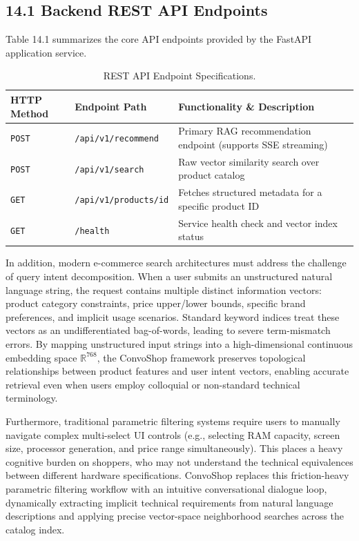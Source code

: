 \documentclass[12pt,a4paper]{article}
\begin{document}
\subsection*{14.1 Backend REST API Endpoints}
\label{sec:14.1}
Table 14.1 summarizes the core API endpoints provided by the FastAPI application service.

\begin{table}[h]
\centering
\caption{REST API Endpoint Specifications.}
\label{tab:14_1}
\begin{tabularx}{\textwidth}{@{} l l X @{}}
\toprule
\textbf{HTTP Method} & \textbf{Endpoint Path} & \textbf{Functionality \& Description} \\
\midrule
\texttt{POST} & \texttt{/api/v1/recommend} & Primary RAG recommendation endpoint (supports SSE streaming) \\
\texttt{POST} & \texttt{/api/v1/search} & Raw vector similarity search over product catalog \\
\texttt{GET} & \texttt{/api/v1/products/{id}} & Fetches structured metadata for a specific product ID \\
\texttt{GET} & \texttt{/health} & Service health check and vector index status \\
\bottomrule
\end{tabularx}
\end{table}



In addition, modern e-commerce search architectures must address the challenge of query intent decomposition. When a user submits an unstructured natural language string, the request contains multiple distinct information vectors: product category constraints, price upper/lower bounds, specific brand preferences, and implicit usage scenarios. Standard keyword indices treat these vectors as an undifferentiated bag-of-words, leading to severe term-mismatch errors. By mapping unstructured input strings into a high-dimensional continuous embedding space $\mathbb{R}^{768}$, the ConvoShop framework preserves topological relationships between product features and user intent vectors, enabling accurate retrieval even when users employ colloquial or non-standard technical terminology.

Furthermore, traditional parametric filtering systems require users to manually navigate complex multi-select UI controls (e.g., selecting RAM capacity, screen size, processor generation, and price range simultaneously). This places a heavy cognitive burden on shoppers, who may not understand the technical equivalences between different hardware specifications. ConvoShop replaces this friction-heavy parametric filtering workflow with an intuitive conversational dialogue loop, dynamically extracting implicit technical requirements from natural language descriptions and applying precise vector-space neighborhood searches across the catalog index.
\end{document}
